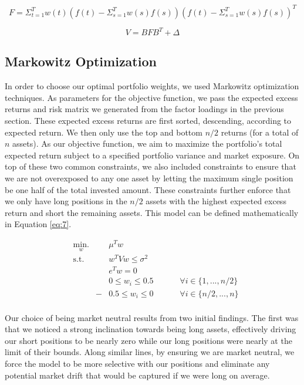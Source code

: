 \documentclass[final]{article}
\begin{document}
\begin{equation}
\label{eq:5}
    F = \Sigma_{t=1}^{T}w(t)(f(t)-\Sigma_{s=1}^{T}w(s)f(s))(f(t)-\Sigma_{s=1}^{T}w(s)f(s))^{T}
\end{equation}

\begin{equation}
    \label{eq:6}
    V = BFB^T+\Delta
\end{equation}

\subsection{Markowitz Optimization}
\hspace{\parindent}In order to choose our optimal portfolio weights, we used Markowitz optimization techniques. As parameters for the objective function, we pass the expected excess returns and risk matrix we generated from the factor loadings in the previous section. These expected excess returns are first sorted, descending, according to expected return. We then only use the top and bottom $n/2$ returns (for a total of $n$ assets). As our objective function, we aim to maximize the portfolio's total expected return subject to a specified portfolio variance and market exposure. On top of these two common constraints, we also included constraints to ensure that we are not overexposed to any one asset by letting the maximum single position be one half of the total invested amount. These constraints further enforce that we only have long positions in the $n/2$ assets with the highest expected excess return and short the remaining assets. This model can be defined mathematically in Equation \ref{eq:7}.

\begin{equation}
\label{eq:7}
\begin{aligned}
& \underset{w}{\text{min.}}
& & \mu^T w \\
& \text{s.t.}
& & w^T V w\leq\sigma^2 \\
& & & e^T w=0 \\
& & & 0\leq w_i \leq 0.5
& & & & \forall i\in\{1,...,n/2\} \\
& & -&0.5\leq w_i \leq 0
& & & & \forall i\in\{n/2,...,n\} \\
\end{aligned}
\end{equation}

Our choice of being market neutral results from two initial findings. The first was that we noticed a strong inclination towards being long assets, effectively driving our short positions to be nearly zero while our long positions were nearly at the limit of their bounds. Along similar lines, by ensuring we are market neutral, we force the model to be more selective with our positions and eliminate any potential market drift that would be captured if we were long on average.
\end{document}
